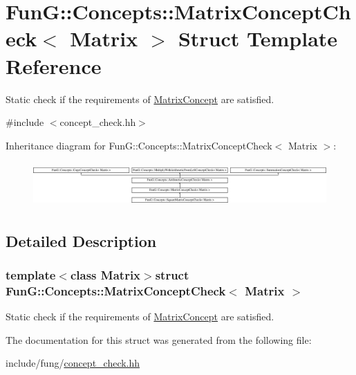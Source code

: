 \hypertarget{structFunG_1_1Concepts_1_1MatrixConceptCheck}{\section{Fun\-G\-:\-:Concepts\-:\-:Matrix\-Concept\-Check$<$ Matrix $>$ Struct Template Reference}
\label{structFunG_1_1Concepts_1_1MatrixConceptCheck}
}


Static check if the requirements of \hyperlink{structFunG_1_1Concepts_1_1MatrixConcept}{Matrix\-Concept} are satisfied.  




{\ttfamily \#include $<$concept\-\_\-check.\-hh$>$}

Inheritance diagram for Fun\-G\-:\-:Concepts\-:\-:Matrix\-Concept\-Check$<$ Matrix $>$\-:\begin{figure}[H]
\begin{center}
\leavevmode
\includegraphics[height=1.728395cm]{structFunG_1_1Concepts_1_1MatrixConceptCheck}
\end{center}
\end{figure}


\subsection{Detailed Description}
\subsubsection*{template$<$class Matrix$>$struct Fun\-G\-::\-Concepts\-::\-Matrix\-Concept\-Check$<$ Matrix $>$}

Static check if the requirements of \hyperlink{structFunG_1_1Concepts_1_1MatrixConcept}{Matrix\-Concept} are satisfied. 

The documentation for this struct was generated from the following file\-:\begin{DoxyCompactItemize}
\item 
include/fung/\hyperlink{concept__check_8hh}{concept\-\_\-check.\-hh}\end{DoxyCompactItemize}
